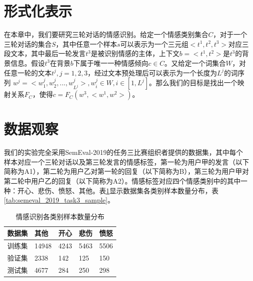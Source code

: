 \section{形式化表示}
\label{sec:exp_context_emo_format}

在本章中，我们要研究三轮对话的情感识别。给定一个情感类别集合$C$，对于一个三轮对话的集合$S$，其中任意一个样本$s$可以表示为一个三元组$<t^1, t^2, t^3>$对应三段文本，其中最后一轮发言$t^3$是被识别情感的主体，上下文$b=<t^1, t^2>$是$t^3$的背景信息。假设$t^3$在背景$b$下属于唯一一种情感倾向$c \in C$。又给定一个词集合$W$，对任意一轮的文本$t^j, j=1,2,3$，经过文本预处理后可以表示为一个长度为$L^j$的词序列 $w^j = <w^j_1, w^j_2, ..., w^j_{L^j}>, w^j_i \in W, i \in [1, L^j]$。那么我们的目标是找出一个映射关系$F_C$，使得$c=F_C(w^3, <w^1, w^2>)$。

\section{数据观察}
\label{sec:exp_context_emo_data}

我们的实验完全采用SemEval-2019的任务三比赛组织者提供的数据集，其中每个样本对应一个三轮对话以及第三轮发言的情感标签，第一轮为用户甲的发言（以下简称为A1），第二轮为用户乙对第一轮的回复（以下简称为B），第三轮为用户甲对第二轮中用户乙的回复（以下简称为A2）。情感标签对应四个情感类别中的其中一种：开心、悲伤、愤怒、其他。表\ref{tab:semeval_2019_task3_data}显示数据集各类别样本数量分布，表\ref{tab:semeval_2019_task3_sample}。

\begin{table}[htb]
  \centering
  \begin{minipage}[t]{0.8\linewidth}
  \caption{情感识别各类别样本数量分布}
  \label{tab:semeval_2019_task3_data}
    \begin{tabularx}{\linewidth}{X|XXXX}
    \toprule[1.5pt]
    数据集 & 其他 & 开心 & 悲伤 & 愤怒 \\  
    \hline
    训练集 & 14948 & 4243 & 5463 & 5506 \\
    验证集 & 2338 & 142 & 125 & 150 \\
    测试集 & 4677 & 284 & 250 & 298 \\
    \bottomrule[1.5pt]
    \end{tabularx}
  \end{minipage}
\end{table}

